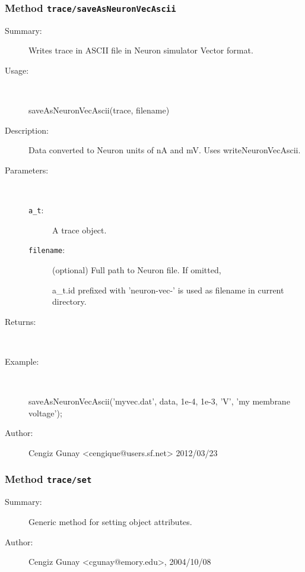 \subsubsection[Method \texttt{saveAsNeuronVecAscii}]{Method \texttt{trace/saveAsNeuronVecAscii}}%
%
\label{ref_trace__saveAsNeuronVecAscii}%
\hypertarget{ref_trace__saveAsNeuronVecAscii}{}%
\begin{description}
\item[Summary:]Writes trace in ASCII file in Neuron simulator Vector format.
%
\item[Usage:]~%
\begin{lyxcode}%
saveAsNeuronVecAscii(trace, filename)
%
\end{lyxcode}%
%
\item[Description:]%
Data converted to Neuron units of nA and mV. Uses writeNeuronVecAscii.
\item[Parameters:]~
\begin{description}%
\item[\texttt{a\_t}:]
 A trace object.
\item[\texttt{filename}:]
 (optional) Full path to Neuron file. If omitted, 

a\_t.id prefixed with 'neuron-vec-' is used as filename in current directory.
\end{description}%
%
\item[Returns:
]~

%
\item[Example:]~
\begin{lyxcode}   saveAsNeuronVecAscii('myvec.dat', data, 1e-4, 1e-3, 'V', 'my membrane voltage');
\\%
\end{lyxcode}
%
%
\item[Author:]%
Cengiz Gunay <cengique@users.sf.net> 2012/03/23
%
\end{description}
\methodline%
\subsubsection[Method \texttt{set}]{Method \texttt{trace/set}}%
%
\label{ref_trace__set}%
\hypertarget{ref_trace__set}{}%
\begin{description}
\item[Summary:]Generic method for setting object attributes.
%
%
%
%
%
%
%
\item[Author:]%
Cengiz Gunay <cgunay@emory.edu>, 2004/10/08
%
\end{description}
\methodline%
